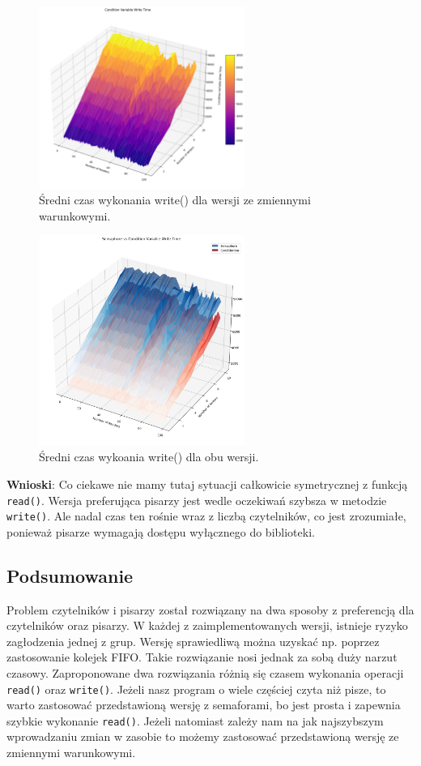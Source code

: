 \documentclass[11pt]{article}
\begin{document}
\begin{figure}[H]
\centering
\includegraphics[width=0.6\textwidth]{./condW.png}
\caption{Średni czas wykonania write() dla wersji ze zmiennymi warunkowymi.}
\end{figure}

\begin{figure}[H]
\centering
\includegraphics[width=0.6\textwidth]{./semcondW.png}
\caption{Średni czas wykoania write() dla obu wersji.}
\end{figure}


\textbf{Wnioski}: Co ciekawe nie mamy tutaj sytuacji całkowicie symetrycznej z funkcją \texttt{read()}.
Wersja preferująca pisarzy jest wedle oczekiwań szybsza w metodzie \texttt{write()}.
Ale nadal czas ten rośnie wraz z liczbą czytelników, co jest zrozumiałe, ponieważ
pisarze wymagają dostępu wyłącznego do biblioteki.
\subsection*{Podsumowanie}
\label{sec:orgb8c84a6}
Problem czytelników i pisarzy został rozwiązany na dwa sposoby z preferencją dla czytelników
oraz pisarzy. W każdej z zaimplementowanych wersji, istnieje ryzyko
zagłodzenia jednej z grup. Wersję sprawiedliwą można uzyskać np. poprzez zastosowanie
kolejek FIFO. Takie rozwiązanie nosi jednak za sobą duży narzut czasowy.
Zaproponowane dwa rozwiązania różnią się czasem wykonania operacji \texttt{read()} oraz \texttt{write()}.
Jeżeli nasz program o wiele częściej czyta niż pisze, to warto zastosować przedstawioną
wersję z semaforami, bo jest prosta i zapewnia szybkie wykonanie \texttt{read()}.
Jeżeli natomiast zależy nam na jak najszybszym wprowadzaniu zmian w zasobie to możemy zastosować przedstawioną wersję ze zmiennymi warunkowymi.
\end{document}
